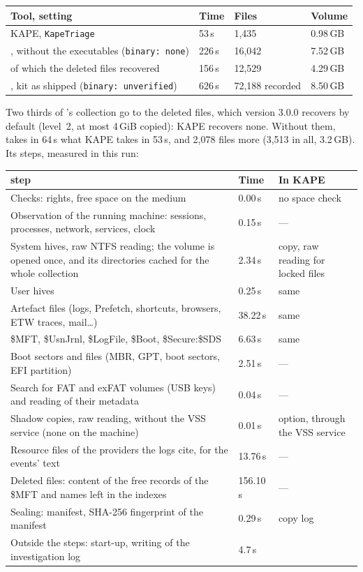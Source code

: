 \documentclass[11pt,a4paper,oneside]{report}
\begin{document}
\begin{longtable}{@{}L{6.2cm}L{2.2cm}L{2.6cm}L{4.0cm}@{}}
\toprule
\textbf{Tool, setting} & \textbf{Time} & \textbf{Files} & \textbf{Volume} \\
\midrule\endhead
KAPE, \texttt{KapeTriage} & 53\,s & 1,435 & 0.98\,GB \\
\wac{}, without the executables (\texttt{binary: none}) & 226\,s & 16,042 & 7.52\,GB \\
\quad of which the deleted files recovered & 156\,s & 12,529 & 4.29\,GB \\
\wac{}, kit as shipped (\texttt{binary: unverified}) & 626\,s & 72,188 recorded & 8.50\,GB \\
\bottomrule
\end{longtable}

Two thirds of \wac{}'s collection go to the deleted files, which version 3.0.0
recovers by default (level~2, at most 4\,GiB copied): KAPE recovers none.
Without them, \wac{} takes in 64\,s what KAPE takes in 53\,s, and 2,078 files
more (3,513 in all, 3.2\,GB). Its steps, measured in this run:

\begin{longtable}{@{}L{8.4cm}L{2.0cm}L{4.6cm}@{}}
\toprule
\textbf{\wac{} step} & \textbf{Time} & \textbf{In KAPE} \\
\midrule\endhead
Checks: rights, free space on the medium & 0.00\,s & no space check \\
Observation of the running machine: sessions, processes, network, services, clock & 0.15\,s & --- \\
System hives, raw NTFS reading; the volume is opened once, and its
  directories cached for the whole collection & 2.34\,s & copy, raw reading for locked files \\
User hives & 0.25\,s & same \\
Artefact files (logs, Prefetch, shortcuts, browsers, ETW traces, mail…) & 38.22\,s & same \\
\$MFT, \$UsnJrnl, \$LogFile, \$Boot, \$Secure:\$SDS & 6.63\,s & same \\
Boot sectors and files (MBR, GPT, boot sectors, EFI partition) & 2.51\,s & --- \\
Search for FAT and exFAT volumes (USB keys) and reading of their metadata & 0.04\,s & --- \\
Shadow copies, raw reading, without the VSS service (none on the machine) & 0.01\,s & option, through the VSS service \\
Resource files of the providers the logs cite, for the events' text & 13.76\,s & --- \\
Deleted files: content of the free records of the \$MFT and names left in
  the indexes & 156.10\,s & --- \\
Sealing: manifest, SHA-256 fingerprint of the manifest & 0.29\,s & copy log \\
Outside the steps: start-up, writing of the investigation log & 4.7\,s & \\
\bottomrule
\end{longtable}
\end{document}
